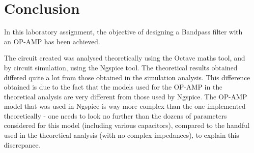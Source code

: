 \section{Conclusion}
\label{sec:conclusion}

In this laboratory assignment, the objective of designing a Bandpass filter with an OP-AMP has been achieved.\par
The circuit created was analysed theoretically using the Octave maths tool, and by circuit simulation, using the
Ngspice tool. The theoretical results obtained differed quite a lot from those obtained in the simulation analysis. This difference obtained is due to the fact that the models used for the OP-AMP in the theoretical analysis are very different from those used by Ngspice. The OP-AMP model that was used in Ngspice is way more complex than the one implemented theoretically - one needs to look no further than the dozens of parameters considered for this model (including various capacitors), compared to the handful used in the theoretical analysis (with no complex impedances), to explain this discrepance. 

